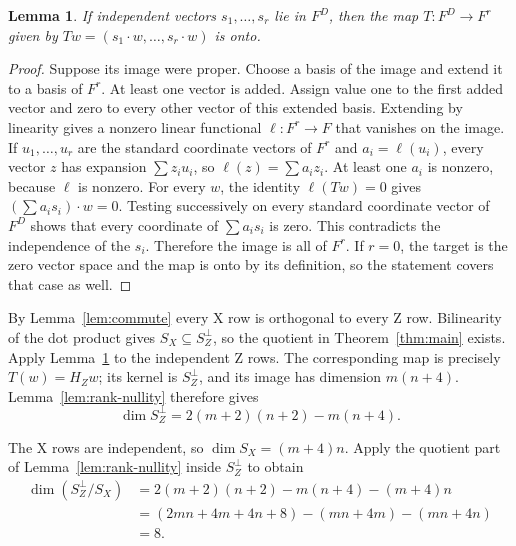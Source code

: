 \documentclass{article}
\newtheorem{lemma}{Lemma}
\begin{document}
\begin{lemma}\label{lem:onto}
If independent vectors \(s_1,\ldots,s_r\) lie in \(F^D\), then the map
\(T:F^D\to F^r\) given by \(Tw=(s_1\cdot w,\ldots,s_r\cdot w)\) is onto.
\end{lemma}

\begin{proof}
Suppose its image were proper. Choose a basis of the image and
extend it to a basis of \(F^r\). At least one vector is added. Assign value one
to the first added vector and zero to every other vector of this extended
basis. Extending by linearity gives a nonzero linear functional \(\ell:F^r\to F\)
that vanishes on the image. If \(u_1,\ldots,u_r\) are the standard coordinate vectors
of \(F^r\) and \(a_i=\ell(u_i)\), every vector \(z\) has expansion \(\sum z_iu_i\), so
\(\ell(z)=\sum a_iz_i\). At least one \(a_i\) is nonzero, because \(\ell\) is nonzero.
For every \(w\), the identity \(\ell(Tw)=0\) gives
\((\sum a_is_i)\cdot w=0\). Testing successively on every standard coordinate vector of
\(F^D\) shows that every coordinate of \(\sum a_is_i\) is zero. This contradicts the
independence of the \(s_i\). Therefore the image is all of \(F^r\). If \(r=0\), the
target is the zero vector space and the map is onto by its definition, so the
statement covers that case as well.
\end{proof}

By Lemma~\ref{lem:commute} every X row is orthogonal to every Z row. Bilinearity of the
dot product gives \(S_X\subseteq S_Z^\perp\), so the quotient in
Theorem~\ref{thm:main} exists.
Apply Lemma~\ref{lem:onto} to the independent Z rows. The corresponding map is
precisely \(T(w)=H_Zw\); its kernel is \(S_Z^\perp\), and its image has dimension
\(m(n+4)\). Lemma~\ref{lem:rank-nullity} therefore gives
\begin{equation}\label{eq:cycle-dimension}
 \dim S_Z^\perp=2(m+2)(n+2)-m(n+4).
\end{equation}

The X rows are independent, so \(\dim S_X=(m+4)n\). Apply the quotient part of
Lemma~\ref{lem:rank-nullity} inside \(S_Z^\perp\) to obtain
\begin{equation}\label{eq:quotient-dimension}
\begin{aligned}
 \dim(S_Z^\perp/S_X)
 &=2(m+2)(n+2)-m(n+4)-(m+4)n\\
 &=(2mn+4m+4n+8)-(mn+4m)-(mn+4n)\\
 &=8.
\end{aligned}
\end{equation}
\end{document}
